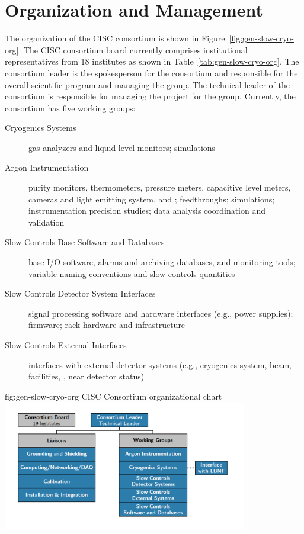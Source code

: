 \section{Organization and Management}
\label{sec:cisc-slow-controls-org}

The organization of the CISC consortium is shown in
 Figure~\ref{fig:gen-slow-cryo-org}. The CISC consortium board currently comprises institutional representatives from 18 institutes as shown in Table~\ref{tab:gen-slow-cryo-org}. The consortium leader is the spokesperson for the consortium and responsible for the overall scientific program and managing the group. The technical leader of the consortium is responsible for managing the project for the group. Currently, the
consortium has five working groups:
\begin{description}
 \item[Cryogenics Systems] gas analyzers and liquid level
  monitors;  simulations
 \item[Argon Instrumentation] purity monitors, thermometers, pressure meters, capacitive level meters, cameras and light emitting system, and ; feedthroughs; \efield simulations; instrumentation precision studies;  data analysis coordination and validation 
 \item [Slow Controls Base Software and Databases]  base I/O software, alarms and archiving databases, and monitoring tools;
   variable naming conventions and slow controls quantities
 \item [Slow Controls Detector System Interfaces] signal processing software and hardware interfaces (e.g., power supplies); firmware; rack hardware and infrastructure   
 \item [Slow Controls External Interfaces] interfaces with external detector systems (e.g., cryogenics system, beam, facilities, , near detector status)
\end{description}

\begin{dunefigure}{fig:gen-slow-cryo-org}
{CISC Consortium organizational chart}
\includegraphics[width=0.8\textwidth]{graphics/cisc_org_20190716_zoomedin.png}
\end{dunefigure}


